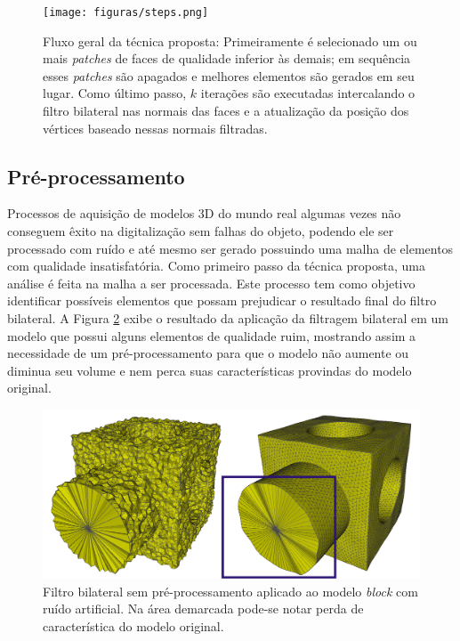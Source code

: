 \begin{figure}[!t]
\captionsetup{width=\linewidth}
\centering
\texttt{[image: figuras/steps.png]}
\caption{Fluxo geral da técnica proposta: Primeiramente é selecionado um ou mais \textit{patches} de faces de qualidade inferior às demais; em sequência esses \textit{patches} são apagados e melhores elementos são gerados em seu lugar. Como último passo, $k$ iterações são executadas intercalando o filtro bilateral nas normais das faces e a atualização da posição dos vértices baseado nessas normais filtradas.}
\label{fig:steps}
\end{figure}

\subsection{Pré-processamento}

Processos de aquisição de modelos 3D do mundo real algumas vezes não conseguem êxito na digitalização sem falhas do objeto, podendo ele ser processado com ruído e até mesmo ser gerado possuindo uma malha de elementos com qualidade insatisfatória. Como primeiro passo da técnica proposta, uma análise é feita na malha a ser processada. Este processo tem como objetivo identificar possíveis elementos que possam prejudicar o resultado final do filtro bilateral. A Figura \ref{fig:comparisonwithoutpreprocessing} exibe o resultado da aplicação da filtragem bilateral em um modelo que possui alguns elementos de qualidade ruim, mostrando assim a necessidade de um pré-processamento para que o modelo não aumente ou diminua seu volume e nem perca suas características provindas do modelo original.


\begin{figure}[!h]
\captionsetup{width=\linewidth}
\centering
\includegraphics[width=\linewidth]{figuras/comparison.png}
\caption{Filtro bilateral sem pré-processamento aplicado ao modelo \textit{block} com ruído artificial. Na área demarcada pode-se notar perda de característica do modelo original.}
\label{fig:comparisonwithoutpreprocessing}
\end{figure}


